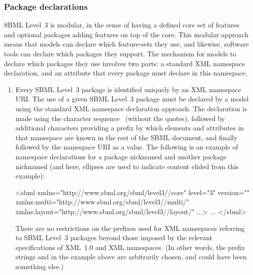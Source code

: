\subsubsection{Package declarations}
\label{sec:sbml-packages}

SBML Level~3 is modular, in the sense of having a defined core set
of features and optional packages adding features on top of the
core.  This modular approach means that models can declare which
feature-sets they use, and likewise, software tools can declare
which packages they support.  The mechanism for models to declare
which packages they use involves two parts: a standard XML
namespace declaration, and an attribute that every package must
declare in this namespace.
\begin{enumerate}

\item Every SBML Level~3 package is identified uniquely by an XML
  namespace URI.  The use of a given SBML Level~3 package must be
  declared by a model using the standard XML namespace declaration
  approach.  The declaration is made using the character sequence
  \ (without the quotes), followed by additional
  characters providing a prefix by which elements and attributes
  in that namespace are known in the rest of the SBML document,
  and finally followed by the namespace URI as a value.  The
  following is an example of namespace declarations for a package
  nicknamed  and another package nicknamed 
  (and here, ellipses are used to indicate content elided from
  this example):
  \begin{example}
<sbml xmlns="http://www.sbml.org/sbml/level3//core" level="3" version=""
      xmlns:multi="http://www.sbml.org/sbml/level3//multi/"
      xmlns:layout="http://www.sbml.org/sbml/level3//layout/" ...>
  ...  
</sbml>\end{example}
  There are no restrictions on the prefixes used for XML namespaces
  referring to SBML Level~3 packages beyond those imposed by the
  relevant specifications of XML~1.0 and XML namespaces.  (In other
  words, the prefix strings  and  in the
  example above are arbitrarily chosen, and could have been
  something else.)


\end{enumerate}
